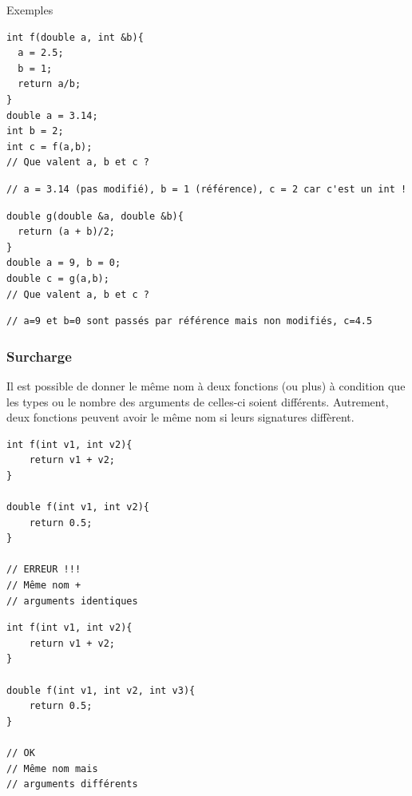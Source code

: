 \begin{frame}[fragile]{Exemples}
\setbeamercovered{} 
\begin{verbatim}
int f(double a, int &b){
  a = 2.5;
  b = 1;
  return a/b;
}
double a = 3.14;
int b = 2;
int c = f(a,b);
// Que valent a, b et c ?
\end{verbatim}
\vspace*{-1em}
\begin{verbatim}
// a = 3.14 (pas modifié), b = 1 (référence), c = 2 car c'est un int !
\end{verbatim}

\vspace*{-1em}
\begin{verbatim}
double g(double &a, double &b){
  return (a + b)/2;
}
double a = 9, b = 0;
double c = g(a,b); 
// Que valent a, b et c ?
\end{verbatim}
\vspace*{-1em}
\begin{verbatim}
// a=9 et b=0 sont passés par référence mais non modifiés, c=4.5
\end{verbatim}
\end{frame}


\begin{frame}[fragile]
	\frametitle{Surcharge}
	Il est possible de donner le même nom à deux fonctions (ou plus) à condition que les types ou le nombre des arguments de celles-ci soient différents. Autrement, deux fonctions peuvent avoir le même nom si leurs signatures diffèrent.
	\vfill
	\begin{minipage}{0.47\linewidth}
	\begin{verbatim}
int f(int v1, int v2){
    return v1 + v2;
}

double f(int v1, int v2){
    return 0.5;
}

// ERREUR !!!
// Même nom +
// arguments identiques
	\end{verbatim}
	\end{minipage}
	\hfill
	\begin{minipage}{0.47\linewidth}
	\begin{verbatim}
int f(int v1, int v2){
    return v1 + v2;
}

double f(int v1, int v2, int v3){
    return 0.5;
}

// OK
// Même nom mais
// arguments différents
	\end{verbatim}
	\end{minipage}

\end{frame}

